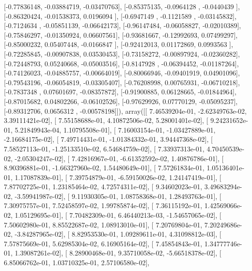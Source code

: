 \documentclass{article}
\begin{document}
       [-0.77836148, -0.03884719, -0.03470763],
       [-0.85375135, -0.0964128 , -0.0440439 ],
       [-0.86320424, -0.01538373,  0.0196094 ],
       [-0.6947149 , -0.1121589 , -0.03145832],
       [-0.7124634 , -0.05851139, -0.06642173],
       [-0.96147484, -0.06058827, -0.02010389],
       [-0.75846297, -0.01350924,  0.06607561],
       [-0.93681667, -0.12992693,  0.07499297],
       [-0.85000232,  0.05407448, -0.0166847 ],
       [-0.92412013,  0.01172869,  0.0993563 ],
       [-0.72285845, -0.00907838,  0.03530453],
       [-0.73158272, -0.00897924, -0.02360282],
       [-0.72448793,  0.05240668, -0.05003516],
       [-0.8147928 , -0.06394452, -0.01187264],
       [-0.74126023, -0.04885757, -0.00664019],
       [-0.80066946, -0.09401919,  0.04901096],
       [-0.79543196, -0.06054819, -0.03305407],
       [-0.76208998,  0.00765931, -0.06710218],
       [-0.7837348 ,  0.07601697, -0.08357872],
       [-0.91900885,  0.06128665, -0.01844964],
       [-0.87015682,  0.04802266, -0.06102526],
       [-0.97629926,  0.07770129, -0.05095237],
       [-0.89312706,  0.0656312 , -0.00578198]]), array([[  7.46539204e-01,  -2.62349763e-02,   3.39111421e-02],
       [  7.55158688e-01,   4.10872506e-02,   5.28001401e-02],
       [  9.24231652e-01,   5.21849943e-04,   1.10795508e-01],
       [  7.16003154e-01,  -1.03427889e-01,  -2.16684175e-02],
       [  7.49714431e-01,  -1.01384332e-01,   3.94447368e-02],
       [  7.58527113e-01,  -1.25133510e-02,   6.54684759e-02],
       [  7.33937313e-01,   4.70450539e-02,  -2.05304247e-02],
       [  7.42816967e-01,  -6.61352592e-02,   1.40876786e-01],
       [  8.90396881e-01,  -1.66327960e-02,   1.54480649e-01],
       [  7.57261834e-01,   1.05136401e-01,   1.17087839e-01],
       [  7.39754879e-01,  -6.59150026e-02,   1.24147419e-01],
       [  7.87702725e-01,   1.23185464e-02,   4.72574311e-02],
       [  9.34602023e-01,   3.49683294e-02,  -3.59941987e-02],
       [  9.11930305e-01,   1.08758368e-01,   1.28493763e-01],
       [  7.30975757e-01,   7.52458597e-02,   1.99785874e-02],
       [  7.36115192e-01,   1.42569066e-02,   1.05129695e-01],
       [  7.70482309e-01,   6.46440213e-03,  -1.54657065e-02],
       [  7.50602980e-01,   8.85522687e-02,   1.08913010e-01],
       [  7.20769804e-01,   7.20249686e-02,  -3.84287965e-02],
       [  8.82953530e-01,   1.09289611e-01,   4.31098812e-03],
       [  7.57875669e-01,   5.62985304e-02,   6.16905164e-02],
       [  7.45854843e-01,   1.34777746e-01,   1.39087261e-02],
       [  8.28900468e-01,   9.35710058e-02,  -5.66518378e-02],
       [  6.85066762e-01,   1.03710325e-01,   2.57106580e-02],
\end{document}
